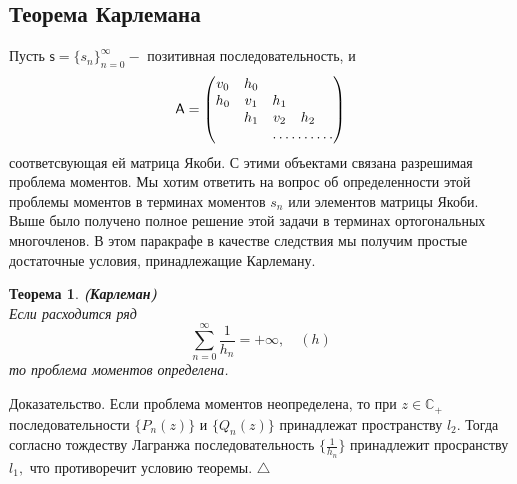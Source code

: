 \documentclass[12 pt, a4 paper]{article}
\theoremstyle{plain}   \newtheorem{Pro}{Задача}
\newtheorem{The}{Теорема}
\begin{document}
\subsection{Теорема Карлемана}
$ \; $
\\
Пусть
$ \mathsf{s}=\{ s_n \} _{n=0}^{\infty} - $
позитивная последовательность, и
$$
  \mathsf{A}=
    \begin{pmatrix}
	  v_0 & h_0 & \; & \; & \; \\
	  h_0 & v_1 & h_1 & \; & \; \\
	  \; & h_1 & v_2 & h_2 & \; \\
	  \; & \; &  \hdotsfor{3}
	\end{pmatrix}
$$
соответсвующая ей матрица Якоби. С этими объектами связана
разрешимая проблема моментов. Мы хотим ответить на вопрос
об определенности этой проблемы моментов в терминах моментов
$ s_n $
или элементов матрицы Якоби. Выше было получено полное
решение этой задачи в терминах ортогональных многочленов.
В этом паракрафе в качестве следствия мы
получим простые достаточные условия, принадлежащие Карлеману.
\begin{The}
{\bfseries (Карлеман)}
\\
Если расходится ряд
$$
  \sum _{n=0}^{\infty} \frac{1}{h_n }=+\infty ,
  \quad (h)
$$
то проблема моментов определена.
\end{The}
{\Large Доказательство.}
Если проблема моментов неопределена, то при
$ z\in \mathbb{C}_+ $
последовательности
$ \{P_n (z) \} $
и
$ \{ Q_n (z) \} $
принадлежат пространству
$ l_2 . $
Тогда согласно тождеству Лагранжа последовательность
$ \{ \frac{1}{h_n} \} $
принадлежит просранству
$ l_1 , $
что противоречит условию теоремы.
$ \triangle $
\\
\end{document}
